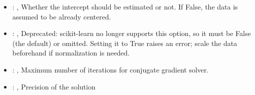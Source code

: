 \begin{itemize}
    \item {}: ,
      Whether the intercept should be estimated or not. If False,
      the data is assumed to be already centered.

    \item {}: ,
      Deprecated: scikit-learn no longer supports this option, so it must be False (the default) or
      omitted.                                                  Setting it to True raises an error;
      scale the data beforehand if normalization is needed.

    \item {}: ,
      Maximum number of iterations for conjugate gradient solver.

    \item {}: ,
      Precision of the solution


\end{itemize}
